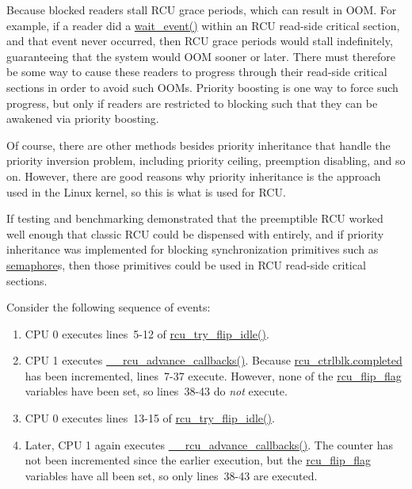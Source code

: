 
	Because blocked readers stall RCU grace periods,
	which can result in OOM.
	For example, if a reader did a \url{wait_event()} within
	an RCU read-side critical section, and that event never occurred,
	then RCU grace periods would stall indefinitely, guaranteeing that
	the system would OOM sooner or later.
	There must therefore be some way to cause these readers to progress
	through their read-side critical sections in order to avoid such OOMs.
	Priority boosting is one way to force such progress, but only if
	readers are restricted to blocking such that they can be awakened via
	priority boosting.

	Of course, there are other methods besides priority inheritance
	that handle the priority inversion problem, including priority ceiling,
	preemption disabling, and so on.
	However, there are good reasons why priority inheritance is the approach
	used in the Linux kernel, so this is what is used for RCU.


	If testing and benchmarking demonstrated that the
	preemptible RCU worked well enough that classic RCU could be dispensed
	with entirely, and if priority inheritance was implemented for blocking
	synchronization primitives
	such as \url{semaphore}s, then those primitives could be
	used in RCU read-side critical sections.


Consider the following sequence of events:
\begin{enumerate}
\item	CPU 0 executes lines~5-12 of
	\url{rcu_try_flip_idle()}.
\item	CPU 1 executes \url{__rcu_advance_callbacks()}.
	Because \url{rcu_ctrlblk.completed} has been
	incremented, lines~7-37 execute.
	However, none of the \url{rcu_flip_flag} variables
	have been set, so lines~38-43 do \emph{not} execute.
\item	CPU 0 executes lines~13-15 of
	\url{rcu_try_flip_idle()}.
\item	Later, CPU 1 again executes \url{__rcu_advance_callbacks()}.
	The counter has not been incremented since the earlier
	execution, but the \url{rcu_flip_flag} variables have
	all been set, so only lines~38-43 are executed.
\end{enumerate}

